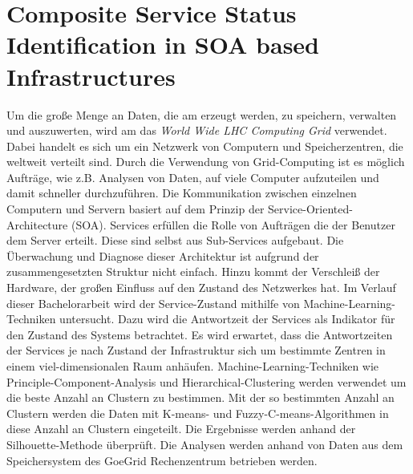 \section{Composite Service Status Identification in SOA based Infrastructures}
Um die große Menge an Daten, die am \lhc erzeugt werden, zu speichern, verwalten und auszuwerten, wird am \cern das \emph{World Wide LHC Computing Grid} verwendet. Dabei handelt es sich um ein Netzwerk von Computern und Speicherzentren, die weltweit verteilt sind. Durch die Verwendung von Grid-Computing ist es möglich Aufträge, wie z.B. Analysen von Daten, auf viele Computer aufzuteilen und damit schneller durchzuführen. Die Kommunikation zwischen einzelnen Computern und Servern basiert auf dem Prinzip der Service-Oriented-Architecture (SOA). Services erfüllen die Rolle von Aufträgen die der Benutzer dem Server erteilt. Diese sind selbst aus Sub-Services aufgebaut. Die Überwachung und Diagnose dieser Architektur ist aufgrund der zusammengesetzten Struktur nicht einfach. Hinzu kommt der Verschleiß der Hardware, der großen Einfluss auf den Zustand des Netzwerkes hat. Im Verlauf dieser Bachelorarbeit wird der Service-Zustand mithilfe von Machine-Learning-Techniken untersucht. Dazu wird die Antwortzeit der Services als Indikator für den Zustand des Systems betrachtet. Es wird erwartet, dass die Antwortzeiten der Services je nach Zustand der Infrastruktur sich um bestimmte Zentren in einem viel-dimensionalen Raum anhäufen. Machine-Learning-Techniken wie Principle-Component-Analysis und Hierarchical-Clustering werden verwendet um die beste Anzahl an Clustern zu bestimmen. 
Mit der so bestimmten Anzahl an Clustern werden die Daten mit K-means- und Fuzzy-C-means-Algorithmen in diese Anzahl an Clustern eingeteilt. Die Ergebnisse werden anhand der Silhouette-Methode überprüft.
Die Analysen werden anhand von Daten aus dem Speichersystem des GoeGrid Rechenzentrum betrieben werden.